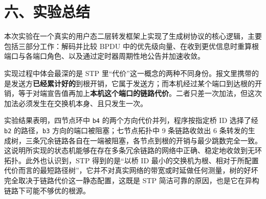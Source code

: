 \documentclass[UTF8,12pt,a4paper,fontset=fandol]{ctexart}
\begin{document}
\section*{六、实验总结}

本次实验在一个真实的用户态二层转发框架上实现了生成树协议的核心逻辑，主要包括三部分工作：解码并比较 BPDU 中的优先级向量、在收到更优信息时重算根端口与各端口角色、以及通过定时器周期性地公告并加速收敛。

实现过程中体会最深的是 STP 里“代价”这一概念的两种不同身份。报文里携带的是发送方\textbf{已经累计好的}到根开销，它属于发送方；而本机经过某个端口到达根的开销，等于对端宣告值再加上\textbf{本机这个端口的链路代价}。二者只差一次加法，但这次加法必须发生在交换机本身、且只发生一次。

实验结果表明，四节点环中 \texttt{b4} 的两个方向代价并列，程序按指定桥 ID 选择了经 \texttt{b2} 的路径，\texttt{b3} 方向的端口被阻塞；七节点拓扑中 9 条链路收敛出 6 条转发的生成树，三条冗余链路各自在一端被阻塞，各节点到根的开销与最少跳数完全一致。这说明所实现的状态机能够在存在多条冗余链路的网络中正确、稳定地收敛到无环拓扑。此外也认识到，STP 得到的是“以桥 ID 最小的交换机为根、相对于所配置代价而言的最短路径树”，它并不对真实网络的带宽或时延做任何测量，树的好坏完全取决于链路代价这一静态配置，这既是 STP 简洁可靠的原因，也是它在异构链路下可能不够优的根源。
\end{document}
